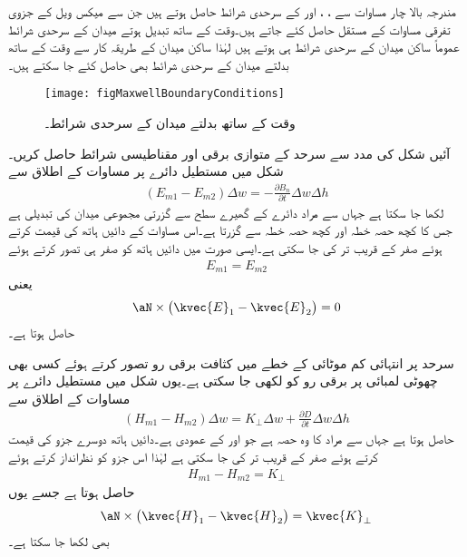 مندرجہ بالا چار مساوات سے ، ،  اور  کے سرحدی شرائط حاصل ہوتے ہیں جن سے میکس ویل کے جزوی تفرقی مساوات کے مستقل حاصل کئے جاتے ہیں۔وقت کے ساتھ تبدیل ہوتے میدان کے سرحدی شرائط عموماً ساکن میدان کے سرحدی شرائط ہی ہوتے ہیں لہٰذا ساکن میدان کے طریقہ کار سے وقت کے ساتھ بدلتے میدان کے سرحدی شرائط بھی حاصل کئے جا سکتے ہیں۔

\begin{figure}
\centering
\texttt{[image: figMaxwellBoundaryConditions]}
\caption{وقت کے ساتھ بدلتے میدان کے سرحدی شرائط۔}
\label{شکل_میکس_ویل_سرحدی_شرائط}
\end{figure}

آئیں شکل   کی مدد سے  سرحد کے متوازی برقی اور مقناطیسی شرائط حاصل کریں۔ شکل میں مستطیل دائرے پر مساوات  کے اطلاق سے
\begin{align*}
\left(E_{m1}-E_{m2}\right) \Delta w=-\frac{\partial B_{n}}{\partial t}  \Delta w \Delta h
\end{align*}  
لکھا جا سکتا ہے جہاں  سے مراد دائرے کے گھیرے سطح سے گزرتی مجموعی میدان کی تبدیلی ہے جس کا کچھ حصہ خطہ  اور کچھ حصہ خطہ  سے گزرتا ہے۔اس مساوات کے دائیں ہاتھ کی قیمت  کرتے ہوئے صفر کے قریب تر کی جا سکتی ہے۔ایسی صورت میں دائیں ہاتھ کو صفر ہی تصور کرتے ہوئے
\begin{align}\label{مساوات_میکس_ویل_سرحدی_شرائط_بدلتے_میدان_الف}
E_{m1}=E_{m2}
\end{align}
یعنی
\begin{align}
\aN \times \left(\kvec{E}_1-\kvec{E}_2 \right)=0
\end{align}
حاصل ہوتا ہے۔

سرحد پر انتہائی کم موٹائی کے خطے میں کثافت برقی رو  تصور کرتے ہوئے کسی بھی چھوٹی لمبائی  پر برقی رو کو  لکھی جا سکتی ہے۔یوں شکل  میں مستطیل دائرے پر مساوات  کے اطلاق سے
\begin{align*}
\left(H_{m1}-H_{m2} \right) \Delta w=K_\perp \Delta w +\frac{\partial D}{\partial t} \Delta w \Delta h
\end{align*}
حاصل ہوتا ہے جہاں  سے مراد  کا وہ حصہ ہے جو  اور  کے عمودی ہے۔دائیں ہاتھ دوسرے جزو کی قیمت  کرتے ہوئے صفر کے قریب تر کی جا سکتی ہے لہٰذا اس جزو کو نظرانداز کرتے ہوئے
\begin{align}\label{مساوات_میکس_ویل_متوازی_مقناطیسی_موج_سرحدی_شرط}
H_{m1}-H_{m2}=K_\perp
\end{align}
حاصل ہوتا ہے جسے یوں
\begin{align}
\aN \times \left(\kvec{H}_1-\kvec{H}_2 \right)=\kvec{K}_\perp
\end{align}
بھی لکھا جا سکتا ہے۔

